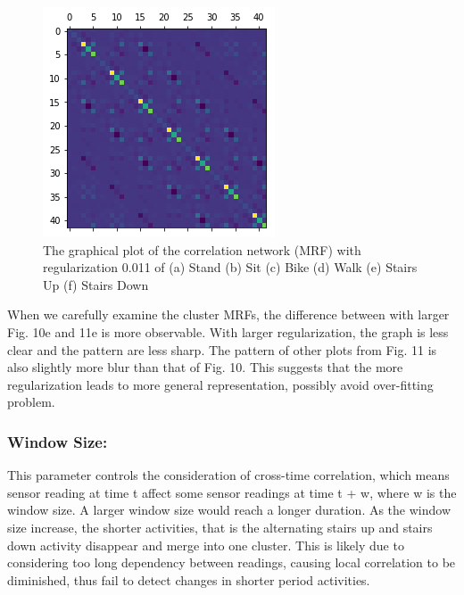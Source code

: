 \documentclass{llncs}
\begin{document}
\begin{figure}[H]
    \includegraphics[width=.3\textwidth]{StairDownL.png}
    \caption{The graphical plot of the correlation network (MRF) with regularization 0.011 of (a) Stand (b) Sit (c) Bike (d) Walk (e) Stairs Up (f) Stairs Down}
    \label{fig:mrf2}
\end{figure}

When we carefully examine the cluster MRFs, the difference between with larger Fig. 10e and 11e is more observable. With larger regularization, the graph is less clear and the pattern are less sharp. The pattern of other plots from Fig. 11 is also slightly more blur than that of Fig. 10. This suggests that the more regularization leads to more general representation, possibly avoid over-fitting problem.

\subsubsection{Window Size:} This parameter controls the consideration of cross-time correlation, which means sensor reading at time t affect some sensor readings at time t + w, where w is the window size. A larger window size would reach a longer duration. As the window size increase, the shorter activities, that is the alternating stairs up and stairs down activity disappear and merge into one cluster. This is likely due to considering too long dependency between readings, causing local correlation to be diminished, thus fail to detect changes in shorter period activities. 
\end{document}
